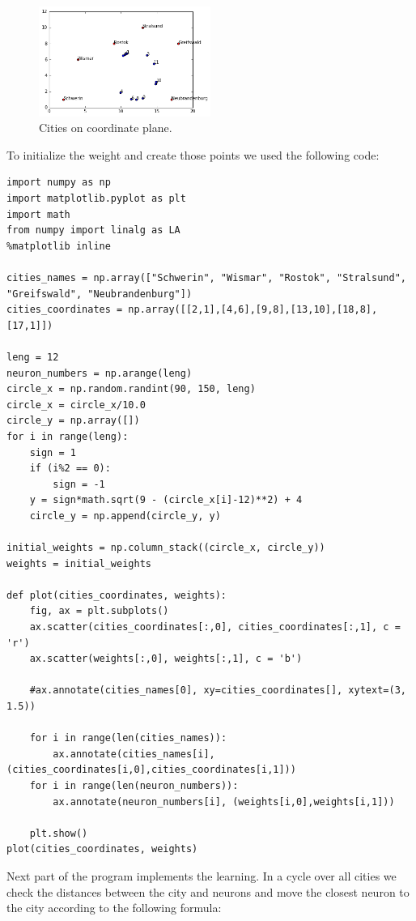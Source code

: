 \documentclass[a4paper, 12pt]{article}
\begin{document}
\begin{figure}[h]
  \centering
  \caption{Cities on coordinate plane.\label{citiesCoord}}
  \includegraphics[width=0.5\textwidth]{cities_plotted}
\end{figure}

To initialize the weight and create those points we used the following code:

\lstset{language=Python}
\begin{lstlisting}[frame=single]
import numpy as np
import matplotlib.pyplot as plt
import math
from numpy import linalg as LA
%matplotlib inline

cities_names = np.array(["Schwerin", "Wismar", "Rostok", "Stralsund", "Greifswald", "Neubrandenburg"])
cities_coordinates = np.array([[2,1],[4,6],[9,8],[13,10],[18,8],[17,1]])

leng = 12
neuron_numbers = np.arange(leng)
circle_x = np.random.randint(90, 150, leng)
circle_x = circle_x/10.0
circle_y = np.array([])
for i in range(leng):
    sign = 1
    if (i%2 == 0):
        sign = -1
    y = sign*math.sqrt(9 - (circle_x[i]-12)**2) + 4
    circle_y = np.append(circle_y, y)

initial_weights = np.column_stack((circle_x, circle_y))
weights = initial_weights

def plot(cities_coordinates, weights):
    fig, ax = plt.subplots()
    ax.scatter(cities_coordinates[:,0], cities_coordinates[:,1], c = 'r')
    ax.scatter(weights[:,0], weights[:,1], c = 'b')

    #ax.annotate(cities_names[0], xy=cities_coordinates[], xytext=(3, 1.5))

    for i in range(len(cities_names)):
        ax.annotate(cities_names[i], (cities_coordinates[i,0],cities_coordinates[i,1]))
    for i in range(len(neuron_numbers)):
        ax.annotate(neuron_numbers[i], (weights[i,0],weights[i,1]))

    plt.show()
plot(cities_coordinates, weights)
\end{lstlisting}

Next part of the program implements the learning. In a cycle over all cities we check the distances between the city and neurons and move the closest neuron to the city according to the following formula:
\end{document}
